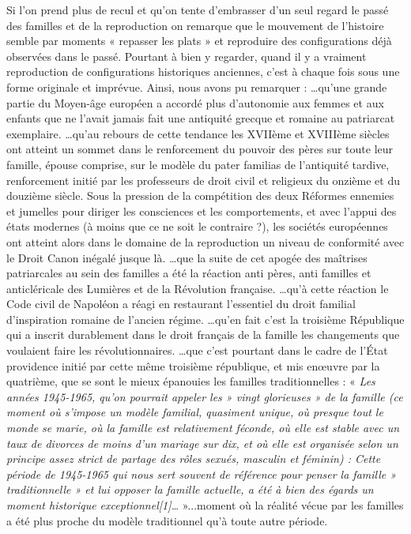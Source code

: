  Si l'on prend plus de recul et qu'on tente d'embrasser d'un seul regard le passé des familles et de la reproduction on remarque que le mouvement de l'histoire semble par moments « repasser les plats » et reproduire des configurations déjà observées dans le passé. Pourtant à bien y regarder, quand il y a vraiment reproduction de configurations historiques anciennes, c'est à chaque fois sous une forme originale et imprévue. 
 Ainsi, nous avons pu remarquer : 
 …qu'une grande partie du Moyen-âge européen a accordé plus d'autonomie aux femmes et aux enfants que ne l'avait jamais fait une antiquité grecque et romaine au patriarcat exemplaire. 
 …qu'au rebours de cette tendance les XVIIème et XVIIIème siècles ont atteint un sommet dans le renforcement du pouvoir des pères sur toute leur famille, épouse comprise, sur le modèle du pater familias de l'antiquité tardive, renforcement initié par les professeurs de droit civil et religieux du onzième et du douzième siècle. Sous la pression de la compétition des deux Réformes ennemies et jumelles pour diriger les consciences et les comportements, et avec l'appui des états modernes (à moins que ce ne soit le contraire ?), les sociétés européennes ont atteint alors dans le domaine de la reproduction un niveau de conformité avec le Droit Canon inégalé jusque là. 
 …que la suite de cet apogée des maîtrises patriarcales au sein des familles a été la réaction anti pères, anti familles et anticléricale des Lumières et de la Révolution française. 
 …qu'à cette réaction le Code civil de Napoléon a réagi en restaurant l'essentiel du droit familial d'inspiration romaine de l'ancien régime. 
 …qu'en fait c'est la troisième République qui a inscrit durablement dans le droit français de la famille les changements que voulaient faire les révolutionnaires. 
 …que c'est pourtant dans le cadre de l'État providence initié par cette même troisième république, et mis enœuvre par la quatrième, que se sont le mieux épanouies les familles traditionnelles : « \emph{ Les années 1945-1965, qu'on pourrait appeler les » vingt glorieuses » de la famille (ce moment où s'impose un modèle familial, quasiment unique, où presque tout le monde se marie, où la famille est relativement féconde, où elle est stable avec un taux de divorces de moins d'un mariage sur dix, et où elle est organisée selon un principe assez strict de partage des rôles sexués, masculin et féminin) : Cette période de 1945-1965 qui nous sert souvent de référence pour penser la famille » traditionnelle » et lui opposer la famille actuelle, a été à bien des égards un moment historique exceptionnel[1]…} »...moment où la réalité vécue par les familles a été plus proche du modèle traditionnel qu'à toute autre période.
